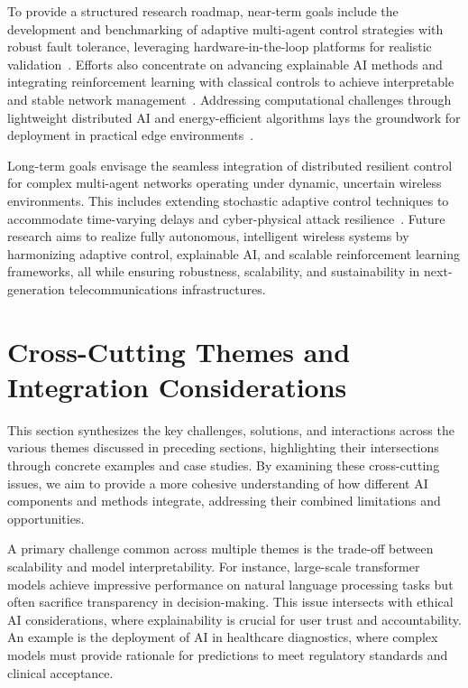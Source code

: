 \documentclass[sigconf]{acmart}
\begin{document}
To provide a structured research roadmap, near-term goals include the development and benchmarking of adaptive multi-agent control strategies with robust fault tolerance, leveraging hardware-in-the-loop platforms for realistic validation~\cite{ref46}. Efforts also concentrate on advancing explainable AI methods and integrating reinforcement learning with classical controls to achieve interpretable and stable network management~\cite{ref50}. Addressing computational challenges through lightweight distributed AI and energy-efficient algorithms lays the groundwork for deployment in practical edge environments~\cite{ref49}.

Long-term goals envisage the seamless integration of distributed resilient control for complex multi-agent networks operating under dynamic, uncertain wireless environments. This includes extending stochastic adaptive control techniques to accommodate time-varying delays and cyber-physical attack resilience~\cite{ref46}. Future research aims to realize fully autonomous, intelligent wireless systems by harmonizing adaptive control, explainable AI, and scalable reinforcement learning frameworks, all while ensuring robustness, scalability, and sustainability in next-generation telecommunications infrastructures.

\section{Cross-Cutting Themes and Integration Considerations}

This section synthesizes the key challenges, solutions, and interactions across the various themes discussed in preceding sections, highlighting their intersections through concrete examples and case studies. By examining these cross-cutting issues, we aim to provide a more cohesive understanding of how different AI components and methods integrate, addressing their combined limitations and opportunities.

A primary challenge common across multiple themes is the trade-off between scalability and model interpretability. For instance, large-scale transformer models achieve impressive performance on natural language processing tasks but often sacrifice transparency in decision-making. This issue intersects with ethical AI considerations, where explainability is crucial for user trust and accountability. An example is the deployment of AI in healthcare diagnostics, where complex models must provide rationale for predictions to meet regulatory standards and clinical acceptance.
\end{document}
